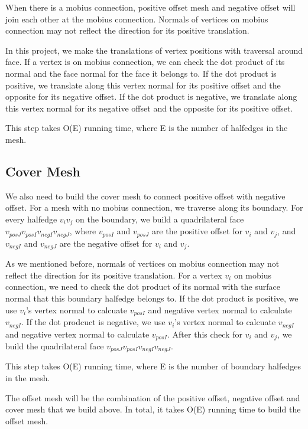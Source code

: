 \documentclass[12pt]{article}
\begin{document}
When there is a mobius connection, positive offset mesh and negative offset will join each other at the mobius connection. Normals of vertices on mobius connection may not reflect the direction for its positive translation. 

In this project, we make the translations of vertex positions with traversal around face. If a vertex is on mobius connection, we can check the dot product of its normal and the face normal for the face it belongs to. If the dot product is positive, we translate along this vertex normal for its positive offset and the opposite for its negative offset. If the dot product is negative, we translate along this vertex normal for its negative offset and the opposite for its positive offset.

This step takes O(E) running time, where E is the number of halfedges in the mesh.

\subsection{Cover Mesh}

We also need to build the cover mesh to connect positive offset with negative offset. For a mesh with no mobius connection, we traverse along its boundary. For every halfedge $v_iv_j$ on the boundary, we build a quadrilateral face $v_{posJ}v_{posI}v_{negI}v_{negJ}$, where $v_{posI}$ and $v_{posJ}$ are the positive offset for $v_i$ and $v_j$, and $v_{negI}$ and $v_{negJ}$ are the negative offset for $v_i$ and $v_j$.

As we mentioned before, normals of vertices on mobius connection may not reflect the direction for its positive translation. For a vertex $v_i$ on mobius connection, we need to check the dot product of its normal with the surface normal that this boundary halfedge belongs to. If the dot product is positive, we use $v_i$'s vertex normal to calcuate $v_{posI}$ and negative vertex normal to calculate $v_{negI}$. If the dot prodcuct is negative, we use $v_i$'s vertex normal to calcuate $v_{negI}$ and negative vertex normal to calculate $v_{posI}$. After this check for $v_i$ and $v_j$, we build the quadrilateral face $v_{posJ}v_{posI}v_{negI}v_{negJ}$.

This step takes O(E) running time, where E is the number of boundary halfedges in the mesh.

The offset mesh will be the combination of the positive offset, negative offset and cover mesh that we build above. In total, it takes O(E) running time to build the offset mesh.
\end{document}
